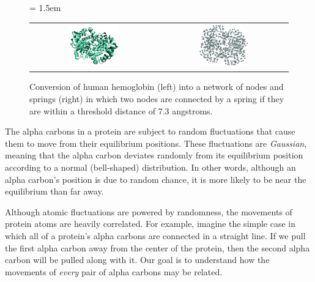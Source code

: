 \begin{figure}[h]
	\centering
	\tabcolsep = 1.5em
	\mySfFamily
	\begin{tabular}{c c}
		\includegraphics[width = 0.4\textwidth]{../images_CMYK/hemoglobin} & \includegraphics[width = 0.4\textwidth]{../images_CMYK/hemoglobin_network}
	\end{tabular}
	\caption{Conversion of human hemoglobin (left) into a network of nodes and springs (right) in which two nodes are connected by a spring if they are within a threshold distance of 7.3 angstroms.}
	\label{fig:hemoglobin_enm}
\end{figure}

The alpha carbons in a protein are subject to random fluctuations that cause them to move from their equilibrium positions. These fluctuations are \textit{Gaussian}, meaning that the alpha carbon deviates randomly from its equilibrium position according to a normal (bell-shaped) distribution. In other words, although an alpha carbon's position is due to random chance, it is more likely to be near the equilibrium than far away.

Although atomic fluctuations are powered by randomness, the movements of protein atoms are heavily correlated. For example, imagine the simple case in which all of a protein's alpha carbons are connected in a straight line. If we pull the first alpha carbon away from the center of the protein, then the second alpha carbon will be pulled along with it. Our goal is to understand how the movements of \textit{every} pair of alpha carbons may be related.

